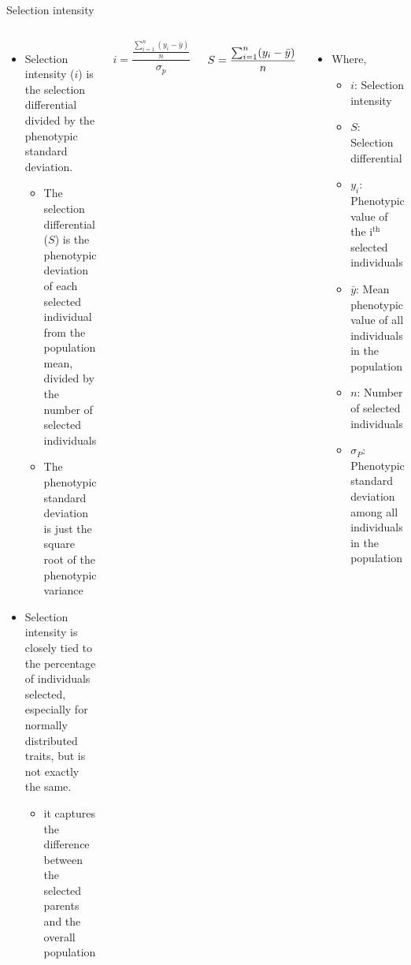 \documentclass[11pt,ignorenonframetext,aspectratio=169]{beamer}
\begin{document}
\begin{frame}{Selection intensity}
\protect\hypertarget{selection-intensity}{}
\begin{columns}
\begin{itemize}
\item Selection intensity ($i$) is the selection differential divided by the phenotypic standard deviation.
  \begin{itemize}
  \item The selection differential ($S$) is the phenotypic deviation of each selected individual from the population mean, divided by the number of selected individuals
  \item The phenotypic standard deviation is just the square root of the phenotypic variance
  \end{itemize}
\item Selection intensity is closely tied to the percentage of individuals selected, especially for normally distributed traits, but is not exactly the same.
  \begin{itemize}
  \item it captures the difference between the selected parents and the overall population
  \end{itemize}
\end{itemize}

$$
i = \frac{\frac{\sum^n_{i = 1} (y_i - \bar{y})}{n}}{\sigma_p}
$$

$$
\small
S = \frac{\sum^n_{i = 1} (y_i - \bar{y})}{n}
$$


\begin{itemize}
\item Where,
  \begin{itemize}
    \footnotesize
    \item $i$: Selection intensity
    \item $S$: Selection differential
    \item $y_i$: Phenotypic value of the $\mathrm{i^{th}}$ selected individuals
    \item $\bar{y}$: Mean phenotypic value of all individuals in the population
    \item $n$: Number of selected individuals
    \item $\sigma_P$: Phenotypic standard deviation among all individuals in the population
    \end{itemize}
  \end{itemize}
  
\end{columns}
\end{frame}
\end{document}
